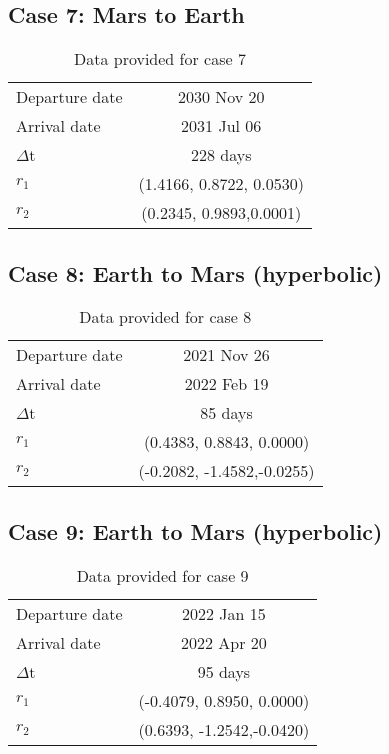 \subsection{Case 7: Mars to Earth}

\begin{table}[H]
\centering
\begin{tabular}{|lc|}
\hline
Departure date              & 2030 Nov 20                \\ 
Arrival date                & 2031 Jul 06 \\ 
$\Delta$t                    & 228 days                   \\ 
$r_1$                          & (1.4166, 0.8722, 0.0530)  \\ 
$r_2$                          & (0.2345, 0.9893,0.0001)   \\ \hline
\end{tabular}
\caption{Data provided for case 7}
\end{table}

\subsection{Case 8: Earth to Mars (hyperbolic)}
 \begin{table}[H]
\centering
\begin{tabular}{|lc|}
\hline
Departure date              & 2021 Nov 26                \\ 
Arrival date                & 2022 Feb 19 \\ 
$\Delta$t                    & 85 days                   \\ 
$r_1$                          & (0.4383, 0.8843, 0.0000)  \\ 
$r_2$                          & (-0.2082, -1.4582,-0.0255)   \\ \hline
\end{tabular}
\caption{Data provided for case 8}
\end{table}

\subsection{Case 9: Earth to Mars (hyperbolic)}

\begin{table}[H]
\centering
\begin{tabular}{|lc|}
\hline
Departure date              & 2022 Jan 15                \\ 
Arrival date                & 2022 Apr 20 \\ 
$\Delta$t                    & 95 days                   \\ 
$r_1$                          & (-0.4079, 0.8950, 0.0000)  \\ 
$r_2$                          & (0.6393, -1.2542,-0.0420)   \\ \hline
\end{tabular}
\caption{Data provided for case 9}
\end{table}